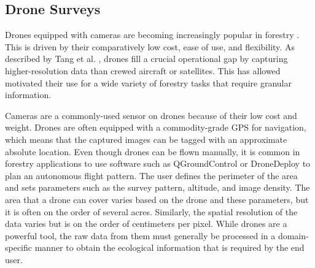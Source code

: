 \subsection{Drone Surveys}
Drones equipped with cameras are becoming increasingly popular in forestry \cite{CristanDronesManagementEdited,Tang2015DronePractices}. This is driven by their comparatively low cost, ease of use, and flexibility. As described by Tang et al. \cite{Tang2015DronePractices}, drones fill a crucial operational gap by capturing higher-resolution data than crewed aircraft or satellites. This has allowed motivated their use for a wide variety of forestry tasks that require granular information.

Cameras are a commonly-used sensor on drones because of their low cost and weight. Drones are often equipped with a commodity-grade GPS for navigation, which means that the captured images can be tagged with an approximate absolute location. Even though drones can be flown manually, it is common in forestry applications to use software such as QGroundControl \cite{QGroundControl} or DroneDeploy \cite{DroneDeploy} to plan an autonomous flight pattern. The user defines the perimeter of the area and sets parameters such as the survey pattern, altitude, and image density. The area that a drone can cover varies based on the drone and these parameters, but it is often on the order of several acres. Similarly, the spatial resolution of the data varies but is on the order of centimeters per pixel.  While drones are a powerful tool, the raw data from them must generally be processed in a domain-specific manner to obtain the ecological information that is required by the end user.  

